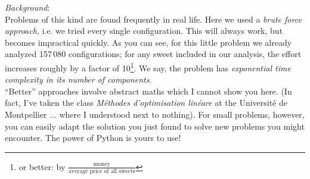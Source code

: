 \documentclass[
	english,
	fontsize=10pt,
	parskip=half,
	titlepage=true,
	DIV=12
]{scrartcl}
\newcommand*{\ie}{i.\;e. }
\begin{document}
\emph{Background}:\\
Problems of this kind are found frequently in real life. Here we used a \emph{brute force approach}, \ie we tried every single configuration. This will always work, but becomes impractical quickly. As you can see, for this little problem we already analyzed 157\,080 configurations; for any sweet included in our analysis, the effort increases roughly by a factor of 10\footnote{or better: by $\frac{\text{money}}{\text{average price of all sweets}}$}. We say, the problem has \emph{exponential time complexity in its number of components}.\\
\enquote{Better} approaches involve abstract maths which I cannot show you here. (In fact, I've taken the class \emph{Méthodes d'optimisation linéare} at the Université de Montpellier ... where I understood next to nothing). For small problems, however, you can easily adapt the solution you just found to solve new problems you might encounter. The power of Python is yours to use!
\end{document}
